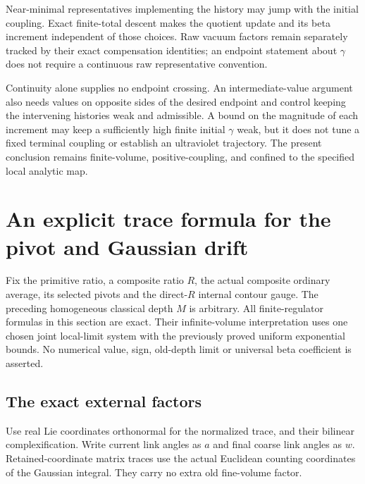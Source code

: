 \documentclass[11pt]{article}
\theoremstyle{remark}
\begin{document}
Near-minimal representatives implementing the history may
jump with the initial coupling. Exact finite-total descent
makes the quotient update and its beta increment independent
of those choices. Raw vacuum factors remain separately
tracked by their exact compensation identities; an endpoint
statement about $\gamma$ does not require a continuous raw
representative convention.

Continuity alone supplies no endpoint crossing. An
intermediate-value argument also needs values on opposite
sides of the desired endpoint and control keeping the
intervening histories weak and admissible. A bound on the
magnitude of each increment may keep a sufficiently high
finite initial $\gamma$ weak, but it does not tune a fixed
terminal coupling or establish an ultraviolet trajectory.
The present conclusion remains finite-volume, positive-coupling,
and confined to the specified local analytic map.


\section{An explicit trace formula for the pivot and Gaussian drift}
\label{dmt-section}

Fix the primitive ratio, a composite ratio \(R\), the actual
composite ordinary average, its selected pivots and the direct-\(R\)
internal contour gauge. The preceding homogeneous classical
depth \(M\) is arbitrary. All finite-regulator formulas in this
section are exact. Their infinite-volume interpretation uses one
chosen joint local-limit system with the previously proved uniform
exponential bounds. No numerical value, sign, old-depth limit or
universal beta coefficient is asserted.

\subsection{The exact external factors}
\label{dmt-definitions-section}

Use real Lie coordinates orthonormal for the normalized trace,
and their bilinear complexification. Write current link angles
as \(a\) and final coarse link angles as \(w\). Retained-coordinate
matrix traces use the actual Euclidean counting coordinates of
the Gaussian integral. They carry no extra old fine-volume factor.
\end{document}
